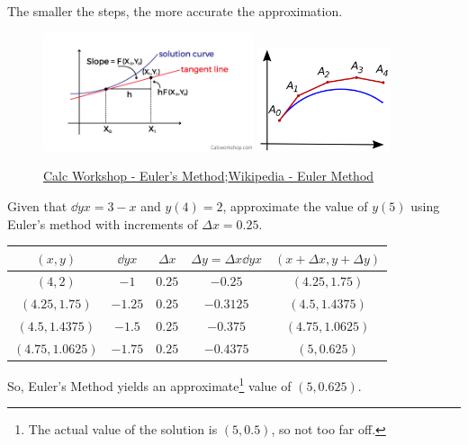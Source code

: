 The smaller the steps, the more accurate the approximation.
\begin{figure}[H]
	\label{eulers_method}
	\centering
	\includegraphics[width=0.55\textwidth]{./applications_integrals/Eulers-Approximation.png}
	\includegraphics[width=0.35\textwidth]{./applications_integrals/Eulers-Approximation2.png}
	\caption{\hyperref{https://calcworkshop.com/first-order-differential-equations/eulers-method-table/}{}{}{Calc Workshop - Euler's Method};\hspace{5pt}\hyperref{https://en.wikipedia.org/wiki/Euler\_method}{}{}{Wikipedia - Euler Method}}
\end{figure}

\begin{example}
	Given that $\dd{y}{x}=3-x$ and $y(4)=2$, approximate the value of $y(5)$ using Euler's method with increments of $\Delta x = 0.25$.
\end{example}
\begin{answer}
	\begin{table}[H]
		\begin{center}
			\begin{tabular}{|c|c|c|c|c|}
				\hline
				$(x,y)$ & $\dd{y}{x}$ & $\Delta x$ & $\Delta y = \Delta x\dd{y}{x}$ & $(x+\Delta x, y+\Delta y)$ \\
				\hline
				$(4,2)$ & $-1$ & $0.25$ & $-0.25$ & $(4.25,1.75)$ \\
				\hline
				$(4.25,1.75)$ & $-1.25$ & $0.25$ & $-0.3125$ & $(4.5,1.4375)$ \\
				\hline
				$(4.5,1.4375)$ & $-1.5$ & $0.25$ & $-0.375$ & $(4.75,1.0625)$ \\
				\hline
				$(4.75,1.0625)$ & $-1.75$ & $0.25$ & $-0.4375$ & $(5,0.625)$ \\
				\hline
			\end{tabular}
		\end{center}
	\end{table}
	
	So, Euler's Method yields an approximate\footnote{The actual value of the solution is $(5,0.5)$, so not too far off.} value of $(5,0.625)$.
\end{answer}